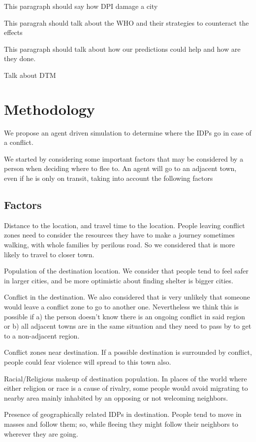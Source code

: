 \documentclass[11pt]{article}
\begin{document}
This paragraph should say how DPI damage a city

This paragrah should talk about the WHO and their strategies to counteract the effects


This paragraph should talk about how our predictions could help and how are they done.

Talk about DTM

\section{Methodology}
\label{sec:orgheadline4}
We propose an agent driven simulation to determine where the IDPs go in case of a conflict.

We started by considering some important factors that may be considered by a
person when deciding where to flee to. An agent will go to an adjacent town,
even if he is only on transit, taking into account the following factors
\subsection{Factors}
\label{sec:orgheadline2}
Distance to the location, and travel time to the location.
People leaving conflict zones need to consider the resources they have to make a journey sometimes walking, with whole families by perilous road. So we considered that is more likely to travel to closer town.

Population of the destination location.  We consider that people tend to feel
safer in larger cities, and be more optimistic about finding shelter is bigger
cities.

Conflict in the destination.  We also considered that is very unlikely that
someone would leave a conflict zone to go to another one. Nevertheless we think
this is possible if a) the person doesn’t know there is an ongoing conflict in
said region or b) all adjacent towns are in the same situation and they need to
pass by to get to a non-adjacent region.

Conflict zones near destination.  If a possible destination is surrounded by
conflict, people could fear violence will spread to this town also.

Racial/Religious makeup of destination population.  In places of the world where
either religion or race is a cause of rivalry, some people would avoid migrating
to nearby area mainly inhabited by an opposing or not welcoming neighbors.

Presence of geographically related IDPs in destination.  People tend to move in
masses and follow them; so, while fleeing they might follow their neighbors to
wherever they are going.
\end{document}

